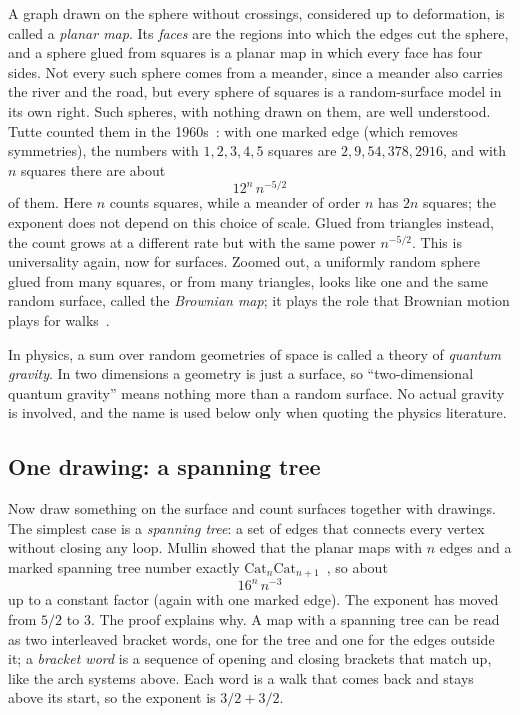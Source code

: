 A graph drawn on the sphere without crossings, considered up to deformation, is called a
\emph{planar map}. Its \emph{faces} are the regions into which the edges cut the sphere, and a
sphere glued from squares is a planar map in which every face has four sides. Not every such
sphere comes from a meander, since a meander also carries the river and the road, but every
sphere of squares is a random-surface model in its own right. Such spheres, with nothing drawn on
them, are well understood. Tutte counted them in the 1960s~\cite{Tutte}: with one marked edge
(which removes symmetries), the numbers with $1,2,3,4,5$ squares are $2, 9, 54, 378, 2916$, and
with $n$ squares there are about
\[ 12^n\, n^{-5/2} \]
of them. Here $n$ counts squares, while a meander of order $n$ has $2n$ squares; the exponent
does not depend on this choice of scale. Glued from triangles instead, the count grows at a
different rate but with the same power $n^{-5/2}$. This is universality again, now for surfaces.
Zoomed out, a uniformly random sphere glued from many squares, or from many triangles, looks like
one and the same random surface, called the \emph{Brownian map}; it plays the role that Brownian
motion plays for walks~\cite{LeGall,Miermont}.

In physics, a sum over random geometries of space is called a theory of \emph{quantum gravity}.
In two dimensions a geometry is just a surface, so ``two-dimensional quantum gravity'' means
nothing more than a random surface. No actual gravity is involved, and the name is used below
only when quoting the physics literature.

\subsection{One drawing: a spanning tree}

Now draw something on the surface and count surfaces together with drawings. The simplest case
is a \emph{spanning tree}: a set of edges that connects every vertex without closing any loop.
Mullin showed that the planar maps with $n$ edges and a marked spanning tree number exactly
$\mathrm{Cat}_n\mathrm{Cat}_{n+1}$~\cite{Mullin}, so about
\[ 16^n\, n^{-3} \]
up to a constant factor (again with one marked edge). The exponent has moved from $5/2$ to $3$.
The proof explains why. A map with a spanning tree can be read as two interleaved bracket words,
one for the tree and one for the edges outside it; a \emph{bracket word} is a sequence of opening
and closing brackets that match up, like the arch systems above. Each word is a walk that comes
back and stays above its start, so the exponent is $3/2+3/2$.

